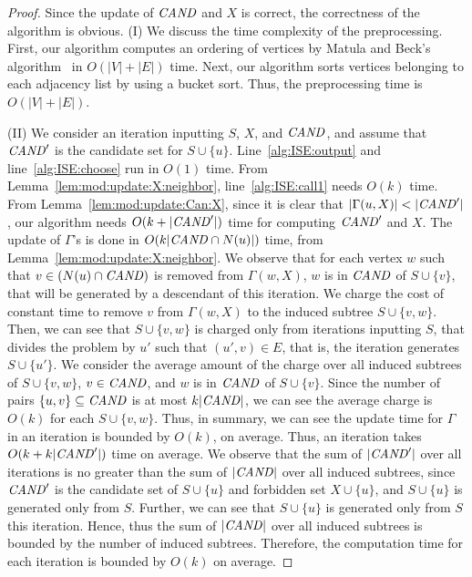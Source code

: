 \documentclass{llncs}
\newcommand{\set}[1]{\{#1\}}
\newcommand{\Can}{{\it CAND}}
\begin{document}
\begin{proof}
    Since the update of $\Can$ and $X$ is correct, 
    the correctness of the algorithm is obvious. 
(I) We discuss the time complexity of the preprocessing. 
    First, our algorithm computes an ordering of vertices 
    by Matula and Beck's algorithm~\cite{Matula:Beck:1983} 
    in $O(|V| + |E|)$ time. 
    Next, our algorithm sorts 
    vertices belonging to each adjacency list by using a bucket sort.
    Thus, the preprocessing time is $O(|V|+|E|)$. 


    (II) 
    We consider an iteration inputting $S$, $X$, and $\Can$, and assume
    that $\Can'$ is the candidate set for $S\cup\set{u}$. 
    Line~\ref{alg:ISE:output} and line~\ref{alg:ISE:choose} run in $O(1)$ time. 
    From Lemma~\ref{lem:mod:update:X:neighbor}, 
    line~\ref{alg:ISE:call1} needs $O(k)$ time. 
From Lemma~\ref{lem:mod:update:Can:X}, 
    since it is clear that $|\Gamma(u, X)| < |\Can'|$,   
    our algorithm needs $O(k + |\Can'|)$ time for computing $\Can'$ and $X$. 
The update of $\Gamma$'s is done in $O(k|\Can\cap N(u)|)$ time, from Lemma~\ref{lem:mod:update:X:neighbor}. 
    We observe that for each vertex $w$ 
    such that $v\in (N(u)\cap \Can)$ is removed from $\Gamma(w, X)$, 
    $w$ is in $\Can$ of $S\cup\set{v}$, 
    that will be generated by a descendant of this iteration.
    We charge the cost of constant time to remove $v$ from $\Gamma(w, X)$ 
    to the induced subtree $S\cup\set{v, w}$. 
    Then, we can see that $S\cup\set{v,w}$ is charged only from iterations inputting $S$, 
    that divides the problem by $u'$ such that $(u',v)\in E$, 
    that is, the iteration generates $S\cup \set{u'}$.
    We consider the average amount of the charge over all induced subtrees of $S\cup\set{v,w}$, 
    $v\in \Can$, and $w$ is in $\Can$ of $S\cup\set{v}$. 
    Since the number of pairs $\set{u,v}\subseteq \Can$ is at most $k|\Can|$, 
    we can see the average charge is $O(k)$ for each $S\cup\set{v,w}$. 
    Thus, in summary, we can see the update time for $\Gamma$ in an iteration is bounded by $O(k)$, on average.
    Thus, an iteration takes $O(k + k |\Can'|)$ time on average.
We observe that the sum of $|\Can'|$ over all iterations is no greater 
    than the sum of $|\Can|$ over all induced subtrees, 
    since $\Can'$ is the candidate set of $S\cup\set{u}$ and forbidden set $X\cup\set{u}$, 
    and $S\cup\set{u}$ is generated only from $S$. 
    Further, we can see that $S\cup\set{u}$ is generated only from $S$ 
    this iteration.
    Hence, 
    thus the sum of $|\Can|$ over all induced subtrees is bounded 
    by the number of induced subtrees. 
    Therefore, 
    the computation time for each iteration is bounded by $O(k)$ on average. 


\end{proof}
\end{document}
